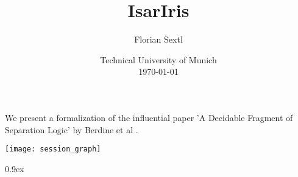\documentclass[11pt,a4paper]{article}
\begin{document}
\title{IsarIris}
\author{Florian Sextl}
\date{Technical University of Munich\\[\baselineskip] \today}
\maketitle

\tableofcontents

We present a formalization of the influential paper 'A Decidable Fragment of
  Separation Logic' by Berdine et al \cite{JoshBerdine.2004}.

\texttt{[image: session\_graph]}

\newpage

\parindent 0pt
\parskip 0.9ex





\end{document}
